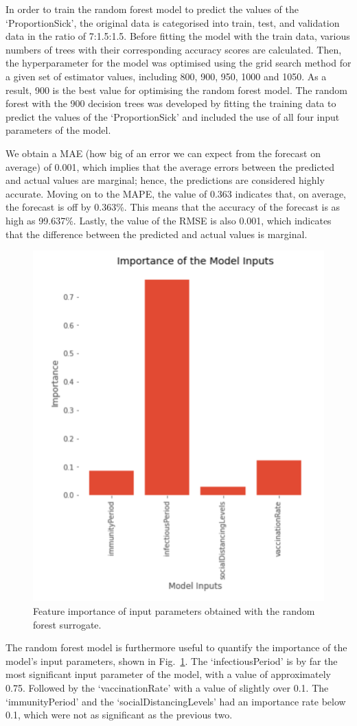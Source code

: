 \documentclass[smallextended]{svjour3}       %
\begin{document}
In order to train the random forest model to predict the values of the ‘ProportionSick’, the original data is categorised into train, test, and validation data in the ratio of 7:1.5:1.5. Before fitting the model with the train data, various numbers of trees with their corresponding accuracy scores are calculated. Then, the hyperparameter for the model was optimised using the grid search method for a given set of estimator values, including 800, 900, 950, 1000 and 1050. As a result, 900 is the best value for optimising the random forest model. The random forest with the 900 decision trees was developed by fitting the training data to predict the values of the ‘ProportionSick’ and included the use of all four input parameters of the model.


We obtain a MAE (how big of an error we can expect from the forecast on average) of 0.001, which implies that the average errors between the predicted and actual values are marginal; hence, the predictions are considered highly accurate. Moving on to the MAPE, the value of 0.363 indicates that, on average, the forecast is off by 0.363\%. This means that the accuracy of the forecast is as high as 99.637\%. Lastly, the value of the RMSE is also 0.001, which indicates that the difference between the predicted and actual values is marginal.

\begin{figure}
	\centering
	\includegraphics[width=0.3\linewidth]{figures/randomForest.png}
	\caption{Feature importance of input parameters obtained with the random forest surrogate.\label{fig:randomForest}}
\end{figure}


The random forest model is furthermore useful to quantify the importance of the model’s input parameters, shown in Fig.~\ref{fig:randomForest}. The ‘infectiousPeriod’ is by far the most significant input parameter of the model, with a value of approximately 0.75. Followed by the ‘vaccinationRate’ with a value of slightly over 0.1. The ‘immunityPeriod’ and the ‘socialDistancingLevels’ had an importance rate below 0.1, which were not as significant as the previous two.
\end{document}
